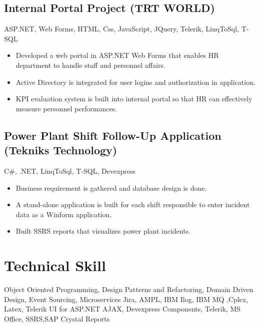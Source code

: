 \documentclass[1pt,a4paper,verdana]{moderncv} %
\begin{document}
\subsection{Internal Portal Project (TRT WORLD)}
 {ASP.NET, Web Forms, HTML, Css, JavaScript, JQuery, Telerik, LinqToSql, T-SQL}
 {\begin{itemize}
		\item Developed a web portal in ASP.NET Web Forms that enables HR department to handle staff and personnel affairs.
		\item Active Directory is integrated for user logins and authorization in application.
		\item KPI evaluation system is built into internal portal so that HR can effectively measure personnel performances.
\end{itemize}}

\subsection{Power Plant Shift Follow-Up Application (Tekniks Technology)}
 {C\#, .NET, LinqToSql, T-SQL, Devexpress}
 {\begin{itemize}
		\item Business requirement is gathered and database design is done.
		\item A stand-alone application is built for each shift responsible to enter incident data as a Winform application.
		\item Built SSRS reports that visualizes power plant incidents.
\end{itemize}}

\section{Technical Skill}

 {Object Oriented Programming, Design Patterns and Refactoring, Domain Driven Design, Event Sourcing, Microservices}
 {Jira, AMPL, IBM Ilog, IBM MQ ,Cplex, Latex, Telerik UI for ASP.NET AJAX, Devexpress Components, Telerik, MS Office, SSRS,SAP Crystal Reports }
\end{document}
